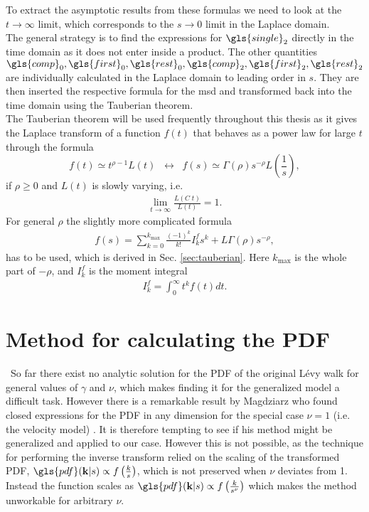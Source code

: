 To extract the asymptotic results from these formulas we need to look at the $t \to \infty$ limit, which corresponds to the $s \to 0$ limit in the Laplace domain. \\
The general strategy is to find the expressions for $\gls{single}_2$ directly in the time domain as it does not enter inside a product. The other quantities $\gls{comp}_0, \gls{first}_0, \gls{rest}_0, \gls{comp}_2, \gls{first}_2, \gls{rest}_2$ are individually calculated in the Laplace domain to leading order in $s$. They are then inserted the respective formula for the \gls{msd} and transformed back into the time domain using the Tauberian theorem. \\
The Tauberian theorem will be used frequently throughout this thesis as it gives the Laplace transform of a function $f(t)$ that behaves as a power law for large $t$ through the formula
% 
\begin{equation}
 f(t) \simeq t^{\rho-1} L(t) \;\; \leftrightarrow \;\; f(s) \simeq \Gamma(\rho) s^{-\rho} L\left(\frac{1}{s}\right) \label{eqn:tauberian} ,
\end{equation}
%
if $\rho \geq 0 $ and $L(t)$ is slowly varying, i.e.
%
\begin{align}
\lim_{t \to \infty} \frac{L(C \; t)}{L(t)} = 1 .
\end{align}
%
For general $\rho$ the slightly more complicated formula 
%
\begin{align}
 f(s) = \sum_{k=0}^{k_{\max}} \frac{(-1)^k}{k!} I^{f}_k s^k + L \Gamma(\rho) s^{-\rho} ,
 \label{eqn:generalTauberian}
\end{align}
%
has to be used, which is derived in Sec. \ref{sec:tauberian}. Here $k_{\max}$ is the whole part of $-\rho$, and $I^{f}_k$ is the moment integral
%
\begin{align}
I^{f}_k = \int_0^\infty t^k f(t) dt.
\end{align}



\section{Method for calculating the PDF}

{\color{blue} \
So far there exist no analytic solution for the \gls{PDF} of the original L\'evy walk for general values of $\gamma$ and $\nu$, which makes finding it for the generalized model a difficult task.
} 
However there is a remarkable result by Magdziarz who found closed expressions for the \gls{PDF} in any dimension for the special case $\nu=1$ (i.e. the velocity model) \cite{magdziarz2015, magdziarz2016}. It is therefore tempting to see if his method might be generalized and applied to our case. However this is not possible, as the technique for performing the inverse transform relied on the scaling of the transformed \gls{PDF}, $\gls{pdf}(\ve{k}|s) \propto f\left( \frac{k}{s} \right)$, which is not preserved when $\nu$ deviates from 1. Instead the function scales as $\gls{pdf}(\ve{k}|s) \propto f\left(\frac{k}{s^{\nu}} \right)$ which makes the method unworkable for arbitrary $\nu$.

